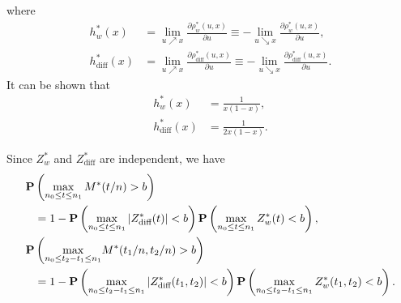 \documentclass[arxiv, preprint]{imsart}
\numberwithin{equation}{section}
\theoremstyle{plain}
\begin{document}
where 
\begin{align*}
 h^*_w(x) & = \lim_{u\nearrow x} \frac{\partial \rho_w^*(u,x)}{\partial u} \equiv -\lim_{u\searrow x} \frac{\partial \rho_w^*(u,x)}{\partial u}, \\
 h^*_\text{diff}(x) & = \lim_{u\nearrow x} \frac{\partial \rho_\text{diff}^*(u,x)}{\partial u} \equiv -\lim_{u\searrow x} \frac{\partial \rho_\text{diff}^*(u,x)}{\partial u} .
\end{align*}
It can be shown that
\begin{align}
h^*_w(x) & = \frac{1}{x(1-x)}, \label{eq:hw} \\
h^*_{\text{diff}}(x) & = \frac{1}{2x(1-x)}. \label{eq:hdiff}
\end{align}

Since $Z_w^*$ and $Z_{\text{diff}}^*$ are independent, we have 
\begin{align*}
\mathbf{P} & \left(\max_{n_0 \le t \le n_1} M^*(t/n) > b \right) \\
& =1 - \mathbf{P} \left( \max_{n_0 \le t \le n_1} |Z^*_\text{diff}(t)| < b \right) \mathbf{P} \left( \max_{n_0 \le t \le n_1} Z^*_w(t) < b \right), \nonumber \\
\mathbf{P} & \left( \underset{n_0 \le t_2 -t_1 \le n_1}{\max} M^*(t_1/n,t_2/n) > b \right)  \\
 & =1 - \mathbf{P} \left( \max_{n_0 \le t_2 -t_1 \le n_1} |Z^*_\text{diff} (t_1,t_2)| < b \right) \mathbf{P} \left( \max_{n_0 \le t_2 -t_1 \le n_1} Z^*_w(t_1,t_2) < b \right). \nonumber
\end{align*}

\end{document}
